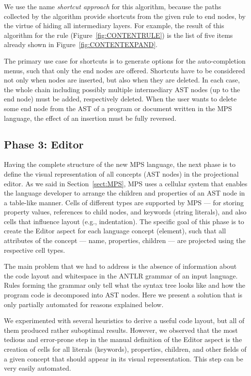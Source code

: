 We use the name \emph{shortcut approach} for this algorithm, because the paths collected by the algorithm provide shortcuts from the given rule to end nodes, by the virtue of hiding all intermediary layers.
For example, the result of this algorithm for the  rule (Figure~\ref{fig:CONTENTRULE}) is the list of five items already shown in Figure~\ref{fig:CONTENTEXPAND}.

The primary use case for shortcuts is to generate options for the auto-completion menus, such that only the end nodes are offered.
Shortcuts have to be considered not only when nodes are inserted, but also when they are deleted.
In each case, the whole chain including possibly multiple intermediary AST nodes (up to the end node) must be added, respectively deleted.
When the user wants to delete some end node from the AST of a program or document written in the MPS language, the effect of an insertion must be fully reversed.

\subsection{Phase 3: Editor}

Having the complete structure of the new MPS language, the next phase is to define the visual representation of all concepts (AST nodes) in the projectional editor.
As we said in Section~\ref{sect:MPS}, MPS uses a cellular system that enables the language developer to arrange the children and properties of an AST node in a table-like manner.
Cells of different types are supported by MPS --- for storing property values, references to child nodes, and keywords (string literals), and also cells that influence layout (e.g., indentation).
The specific goal of this phase is to create the Editor aspect for each language concept (element), such that all attributes of the concept --- name, properties, children --- are projected using the respective cell types.

The main problem that we had to address is the absence of information about the code layout and whitespace in the ANTLR grammar of an input language.
Rules forming the grammar only tell what the syntax tree looks like and how the program code is decomposed into AST nodes.
Here we present a solution that is only partially automated for reasons explained below.

We experimented with several heuristics to derive a useful code layout, but all of them produced rather suboptimal results.
However, we observed that the most tedious and error-prone step in the manual definition of the Editor aspect is the creation of cells for all literals (keywords), properties, children, and other fields of a given concept that should appear in its visual representation.
This step can be very easily automated.

